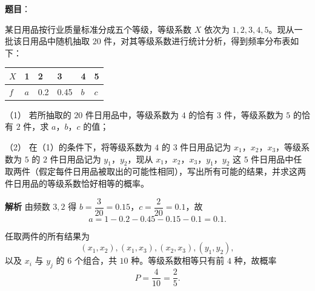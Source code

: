 \begin{answer}

\textbf{题目}：

某日用品按行业质量标准分成五个等级，等级系数 $X$ 依次为 $1,2,3,4,5$。现从一批该日用品中随机抽取 $20$ 件，对其等级系数进行统计分析，得到频率分布表如下：

\begin{center}
\begin{tabular}{llllll}
\toprule
$X$ & 1 & 2 & 3 & 4 & 5 \\
\midrule
$f$ & $a$ & 0.2 & 0.45 & $b$ & $c$ \\
\bottomrule
\end{tabular}
\end{center}

（1） 若所抽取的 $20$ 件日用品中，等级系数为 $4$ 的恰有 $3$ 件，等级系数为 $5$ 的恰有 $2$ 件，求 $a$，$b$，$c$ 的值；

（2） 在（1）的条件下，将等级系数为 $4$ 的 $3$ 件日用品记为 $x_1$，$x_2$，$x_3$，等级系数为 $5$ 的 $2$ 件日用品记为 $y_1$，$y_2$，现从 $x_1$，$x_2$，$x_3$，$y_1$，$y_2$ 这 $5$ 件日用品中任取两件（假定每件日用品被取出的可能性相同），写出所有可能的结果，并求这两件日用品的等级系数恰好相等的概率。

\textbf{解析}
由频数 $3,2$ 得 $b=\dfrac3{20}=0.15$，$c=\dfrac2{20}=0.1$，故
\nopagebreak[4]
\[a=1-0.2-0.45-0.15-0.1=0.1.\]

任取两件的所有结果为
\nopagebreak[4]
\[(x_1,x_2),(x_1,x_3),(x_2,x_3),(y_1,y_2),\]
以及 $x_i$ 与 $y_j$ 的 $6$ 个组合，共 $10$ 种。等级系数相等只有前 $4$ 种，故概率
\nopagebreak[4]
\[P=\frac4{10}=\frac25.\]



\end{answer}
